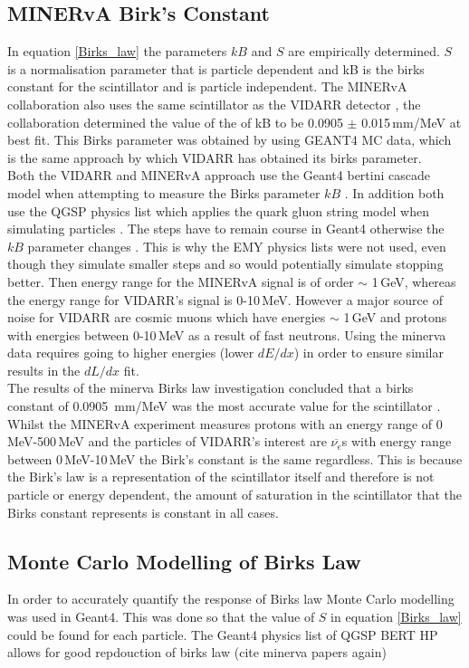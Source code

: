 \documentclass[12pt,a4paper]{article}
\begin{document}
\subsection{MINERvA Birk's Constant}
In equation \ref{Birks_law} the parameters $kB$ and $S$ are empirically determined. $S$ is a normalisation parameter that is particle dependent and kB is the birks constant for the scintillator and is particle independent. The MINERvA collaboration \cite{minerva_birks} also uses the same scintillator as the VIDARR detector \cite{Minerva_scint}, the collaboration determined the value of the of kB to be 0.0905 $\pm$ 0.015\,mm/MeV at best fit. This Birks parameter was obtained by using GEANT4 MC data, which is the same approach by which VIDARR has obtained its birks parameter.\\

Both the VIDARR and MINERvA approach use the Geant4 bertini cascade model when attempting to measure the Birks parameter $kB$ \cite{Geant4_bert_cas}. In addition both use the QGSP physics list which applies the quark gluon string model when simulating particles \cite{Minerva_QGSP}. The steps have to remain course in Geant4 otherwise the $kB$ parameter changes  \cite{minerva_birks}. This is why the EMY physics lists were not used, even though they simulate smaller steps and so would potentially simulate stopping better. Then energy range for the MINERvA signal is of order $\sim$ 1\,GeV, whereas the energy range for VIDARR's signal is 0-10\,MeV. However a major source of noise for VIDARR are cosmic muons which have energies $\sim$ 1\,GeV and protons with energies between 0-10\,MeV as a result of fast neutrons. Using the minerva data requires going to higher energies (lower $dE/dx$) in order to ensure similar results in the $dL/dx$ fit.  \\

The results of the minerva Birks law investigation concluded that a birks constant of 0.0905 \,mm/MeV was the most accurate value for the scintillator \cite{minerva_birks}. Whilst the MINERvA experiment measures protons with an energy range of 0\,MeV-500\,MeV and the particles of VIDARR's interest are $\overline{\nu_{e}}$s with energy range between 0\,MeV-10\,MeV the Birk's constant is the same regardless. This is because the Birk's law is a representation of the scintillator itself and therefore is not particle or energy dependent, the amount of saturation in the scintillator that the Birks constant represents is constant in all cases.

\subsection{Monte Carlo Modelling of Birks Law}
In order to accurately quantify the response of Birks law Monte Carlo modelling was used in Geant4. This was done so that the value of $S$ in equation \ref{Birks_law} could be found for each particle. The Geant4 physics list of QGSP \textunderscore BERT \textunderscore HP allows for good repdouction of birks law (cite minerva papers again)
 
\end{document}
